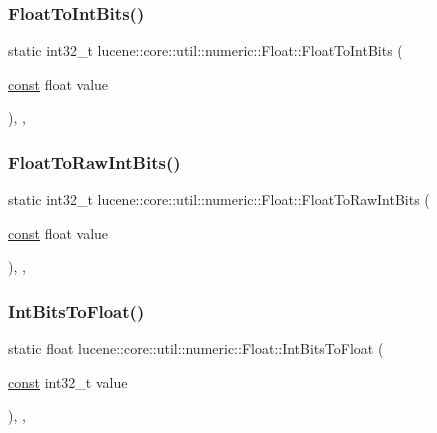 \subsubsection{\texorpdfstring{Float\+To\+Int\+Bits()}{FloatToIntBits()}}
{\footnotesize\ttfamily static int32\+\_\+t lucene\+::core\+::util\+::numeric\+::\+Float\+::\+Float\+To\+Int\+Bits (\begin{DoxyParamCaption}\item[{\mbox{\hyperlink{ZlibCrc32_8h_a2c212835823e3c54a8ab6d95c652660e}{const}} float}]{value }\end{DoxyParamCaption})\hspace{0.3cm}{\ttfamily [inline]}, {\ttfamily [static]}, {\ttfamily [noexcept]}}

\mbox{\label{classlucene_1_1core_1_1util_1_1numeric_1_1Float_ac73cdb781ed72d155cacf4e8a4fa4ecb}} 
\subsubsection{\texorpdfstring{Float\+To\+Raw\+Int\+Bits()}{FloatToRawIntBits()}}
{\footnotesize\ttfamily static int32\+\_\+t lucene\+::core\+::util\+::numeric\+::\+Float\+::\+Float\+To\+Raw\+Int\+Bits (\begin{DoxyParamCaption}\item[{\mbox{\hyperlink{ZlibCrc32_8h_a2c212835823e3c54a8ab6d95c652660e}{const}} float}]{value }\end{DoxyParamCaption})\hspace{0.3cm}{\ttfamily [inline]}, {\ttfamily [static]}, {\ttfamily [noexcept]}}

\mbox{\label{classlucene_1_1core_1_1util_1_1numeric_1_1Float_aca55501557a1c47bb91659186cb7168e}} 
\subsubsection{\texorpdfstring{Int\+Bits\+To\+Float()}{IntBitsToFloat()}}
{\footnotesize\ttfamily static float lucene\+::core\+::util\+::numeric\+::\+Float\+::\+Int\+Bits\+To\+Float (\begin{DoxyParamCaption}\item[{\mbox{\hyperlink{ZlibCrc32_8h_a2c212835823e3c54a8ab6d95c652660e}{const}} int32\+\_\+t}]{value }\end{DoxyParamCaption})\hspace{0.3cm}{\ttfamily [inline]}, {\ttfamily [static]}, {\ttfamily [noexcept]}}

